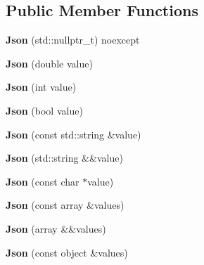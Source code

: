 \subsection*{Public Member Functions}
\begin{DoxyCompactItemize}
\item 
\mbox{\label{classjson11_1_1_json_a5c9ebb114542d45840876ec1b9785adb}} 
{\bfseries Json} (std\+::nullptr\+\_\+t) noexcept
\item 
\mbox{\label{classjson11_1_1_json_aa3ada8b1d684b2491025ce177cd78a74}} 
{\bfseries Json} (double value)
\item 
\mbox{\label{classjson11_1_1_json_a57f7fa34ef7bd11e9e02078eb62f371d}} 
{\bfseries Json} (int value)
\item 
\mbox{\label{classjson11_1_1_json_a3983a96e0690d20c3599c0680be64711}} 
{\bfseries Json} (bool value)
\item 
\mbox{\label{classjson11_1_1_json_a369e51068a0619ef40bb591b08a158c3}} 
{\bfseries Json} (const std\+::string \&value)
\item 
\mbox{\label{classjson11_1_1_json_a9e296e1e948d122644ca589f5a2ee8e7}} 
{\bfseries Json} (std\+::string \&\&value)
\item 
\mbox{\label{classjson11_1_1_json_a3929d4218558acec8a0ff7db45a79129}} 
{\bfseries Json} (const char $\ast$value)
\item 
\mbox{\label{classjson11_1_1_json_a0a29e383d62ebc0f2073dc0b1c25c7f5}} 
{\bfseries Json} (const array \&values)
\item 
\mbox{\label{classjson11_1_1_json_af8d64a61eb4df43bd0cd5d495a78c9dc}} 
{\bfseries Json} (array \&\&values)
\item 
\mbox{\label{classjson11_1_1_json_a2c178480d5854bcd615b99e87814bf4e}} 
{\bfseries Json} (const object \&values)
\item 
\mbox{\label{classjson11_1_1_json_a2e09039acf3d560149b588709da6b74d}} 

\end{DoxyCompactItemize}
